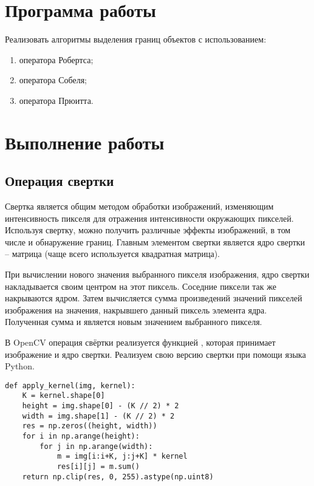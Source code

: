





\tableofcontents
\newpage

\section{Программа работы}

Реализовать алгоритмы выделения границ объектов с использованием:
\begin{enumerate}
	\item оператора Робертса;
	\item оператора Собеля;
	\item оператора Прюитта.
\end{enumerate}

\section{Выполнение работы}

\subsection{Операция свертки}

Свертка является общим методом обработки изображений, изменяющим интенсивность пикселя для отражения интенсивности окружающих пикселей. Используя свертку, можно получить различные эффекты изображений, в том числе и обнаружение границ. Главным элементом свертки является ядро свертки -- матрица (чаще всего используется квадратная матрица).

При вычислении нового значения выбранного пикселя изображения, ядро свертки накладывается своим центром на этот пиксель. Соседние пиксели так же накрываются ядром. Затем вычисляется сумма произведений значений пикселей изображения на значения, накрывшего данный пиксель элемента ядра. Полученная сумма и является новым значением выбранного пикселя.

В OpenCV операция свёртки реализуется функцией , которая принимает изображение и ядро свертки. Реализуем свою версию свертки при помощи языка Python.

\begin{lstlisting}
def apply_kernel(img, kernel):
    K = kernel.shape[0]
    height = img.shape[0] - (K // 2) * 2
    width = img.shape[1] - (K // 2) * 2
    res = np.zeros((height, width))
    for i in np.arange(height):
        for j in np.arange(width):
            m = img[i:i+K, j:j+K] * kernel
            res[i][j] = m.sum()
    return np.clip(res, 0, 255).astype(np.uint8)
\end{lstlisting}

